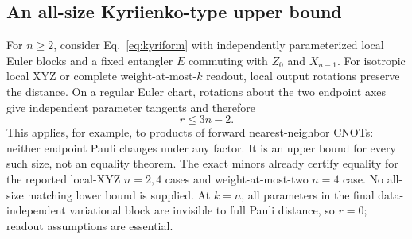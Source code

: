 \subsection{An all-size Kyriienko-type upper bound}
For $n\ge2$, consider Eq.~\eqref{eq:kyriform} with independently
parameterized local Euler blocks and a fixed entangler $E$ commuting
with $Z_0$ and $X_{n-1}$. For isotropic local XYZ or complete
weight-at-most-$k$ readout, local output rotations preserve the
distance. On a regular Euler chart, rotations about the two endpoint
axes give independent parameter tangents and therefore
\begin{equation}
 r\le3n-2.\label{eq:kyrifamilyupper}
\end{equation}
This applies, for example, to products of forward nearest-neighbor
CNOTs: neither endpoint Pauli changes under any factor. It is an
upper bound for every such size, not an equality theorem.
The exact minors already certify equality for the reported local-XYZ
$n=2,4$ cases and weight-at-most-two $n=4$ case. No all-size matching
lower bound is supplied. At $k=n$, all parameters in the final
data-independent variational block are invisible to full Pauli
distance, so $r=0$; readout assumptions are essential.
